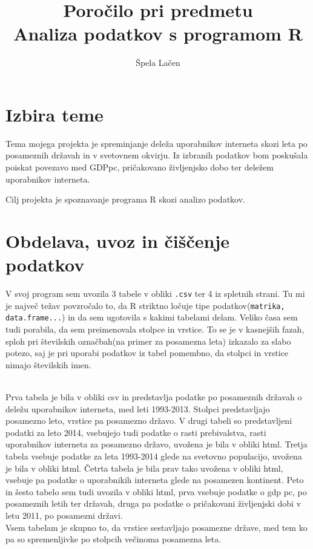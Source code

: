 \documentclass[11pt,a4paper]{article}
\begin{document}
\author{Špela Lačen}
\title{Poročilo pri predmetu \\
Analiza podatkov s programom R}
\maketitle

\section{Izbira teme}

Tema mojega projekta je spreminjanje deleža uporabnikov interneta skozi leta po posameznih državah in v svetovnem okvirju. Iz izbranih podatkov bom poskušala poiskat povezavo med  GDPpc, pričakovano življenjsko dobo ter deležem uporabnikov interneta. 

\bigskip 
Cilj projekta je spoznavanje programa R skozi analizo podatkov.

\section{Obdelava, uvoz in čiščenje podatkov}

V svoj program sem uvozila 3 tabele  v obliki \verb|.csv| ter 4 iz spletnih strani. Tu mi je največ težav povzročalo to, da R striktno ločuje tipe podatkov\-(\verb|matrika, data.frame...|) in da sem ugotovila s kakimi tabelami delam. Veliko časa sem tudi porabila, da sem preimenovala stolpce in vrstice. To se je v kasnejših fazah, sploh pri številskih označbah(na primer za posamezna leta) izkazalo za slabo potezo, saj je pri uporabi podatkov iz tabel pomembno, da stolpci in vrstice nimajo številskih imen. 

\\Prva tabela je bila v obliki csv in predstavlja podatke po posameznih državah o deležu uporabnikov interneta, med leti 1993-2013. Stolpci predstavljajo posamezno leto, vrstice pa posamezno državo.
V drugi tabeli so predstavljeni podatki za leto 2014, vsebujejo tudi podatke o rasti prebivalstva, rasti uporabnikov interneta za posamezno državo, uvožena je bila v obliki html.
Tretja tabela vsebuje podatke za leta 1993-2014 glede na svetovno populacijo, uvožena je bila v obliki html.
Četrta tabela je bila prav tako uvožena v obliki html, vsebuje pa podatke o uporabnikih interneta glede na posamezen kontinent. Peto in šesto tabelo sem tudi uvozila v obliki html, prva vsebuje podatke o gdp pc, po posameznih letih ter državah, druga pa podatke o pričakovani življenjski dobi v letu 2011, po posamezni državi.
\\Vsem tabelam je skupno to, da vrstice sestavljajo posamezne države, med tem ko pa so spremenljivke po stolpcih večinoma posamezna leta.
\end{document}
